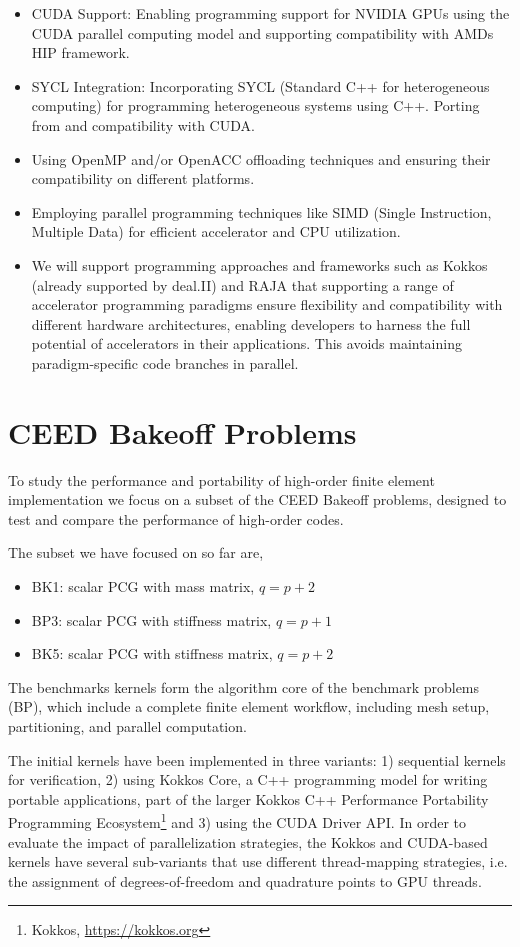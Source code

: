 \documentclass[a4paper,12pt]{article}
\begin{document}
\begin{itemize}
\item CUDA Support: Enabling programming support for NVIDIA GPUs using the CUDA parallel computing model and
supporting compatibility with AMDs HIP framework.
\item SYCL Integration: Incorporating SYCL (Standard C++ for heterogeneous computing) for programming heterogeneous
systems using C++. Porting from and compatibility with CUDA.
\item Using OpenMP and/or OpenACC offloading techniques and ensuring their compatibility on different
platforms.
\item Employing parallel programming techniques like SIMD (Single Instruction, Multiple Data) for efficient accelerator
and CPU utilization.
\item We will support programming approaches and frameworks such as Kokkos (already supported by deal.II) and RAJA
that supporting a range of accelerator programming paradigms ensure flexibility and compatibility with different
hardware architectures, enabling developers to harness the full potential of accelerators in their applications. This avoids maintaining paradigm-specific code branches in parallel.
\end{itemize}

\newpage

\section{CEED Bakeoff Problems}

To study the performance and portability of high-order finite element implementation we focus on a subset of the CEED Bakeoff problems, designed to test and compare
the performance of high-order codes.

The subset we have focused on so far are,
\begin{itemize}
    \item BK1: scalar PCG with mass matrix, $q = p+2$
    \item BP3: scalar PCG with stiffness matrix, $q = p+1$
    \item BK5: scalar PCG with stiffness matrix, $q = p+2$
\end{itemize}
The benchmarks kernels form the algorithm core of the benchmark problems (BP), which include a complete finite element workflow, including mesh setup, partitioning, and parallel computation.

The initial kernels have been implemented in three variants: 1) sequential kernels for verification, 2) using Kokkos Core, a C++ programming model for writing portable applications, part of the larger Kokkos C++ Performance Portability Programming Ecosystem\footnote{Kokkos, \url{https://kokkos.org}} and 3) using the CUDA Driver API. In order to evaluate the impact of parallelization strategies, the Kokkos and CUDA-based kernels have several sub-variants that use different thread-mapping strategies, i.e. the assignment of degrees-of-freedom and quadrature points to GPU threads.
\end{document}
